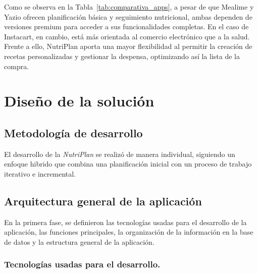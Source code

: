 \documentclass[12pt,a4paper]{report} %
\begin{document}
	Como se observa en la Tabla~\ref{tab:comparativa_apps}, a pesar de que Mealime y Yazio ofrecen planificación básica y seguimiento nutricional, ambas dependen de versiones premium para acceder a sus funcionalidades completas. En el caso de Instacart, en cambio, está más orientada al comercio electrónico que a la salud. Frente a ello, NutriPlan aporta una mayor flexibilidad al permitir la creación de recetas personalizadas y gestionar la despensa, optimizando así la lista de la compra.
	\\
	
	\section*{Diseño de la solución}	
	
	\subsection*{Metodología de desarrollo}
	El desarrollo de la \textit{NutriPlan} se realizó de manera individual, siguiendo un enfoque hibrido que combina una planificación inicial con un proceso de trabajo iterativo e incremental.

	\subsection*{Arquitectura general de la aplicación}
	
	En la primera fase, se definieron las tecnologías usadas para el desarrollo de la aplicación, las funciones principales, la organización de la información en la base de datos y la estructura general de la aplicación.
	
	\subsubsection*{Tecnologías usadas para el desarrollo.}
\end{document}
